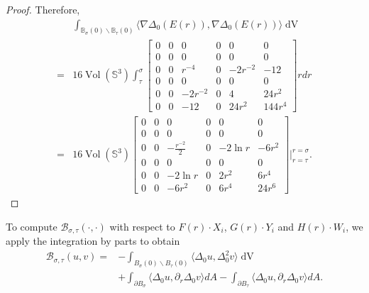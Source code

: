 \documentclass[11pt,letterpaper]{amsart}
\DeclareMathOperator{\Vol}{Vol}
\DeclareMathOperator{\dvol}{dV}
\newcommand{\mB}{\mathcal{B}}
\newcommand{\bB}{\mathbb{B}}
\newcommand{\bS}{\mathbb{S}}
\theoremstyle{definition}
\theoremstyle{remark}
\numberwithin{equation}{section}
\begin{document}
\begin{proof}
Therefore,
\begin{equation}
\begin{split}
    &\int_{\bB_{\sigma}(0)\backslash \bB_{\tau}(0)}\langle \nabla \Delta_0 (E(r)), \nabla \Delta_0(E(r))\rangle \dvol\\
    =&16\Vol(\bS^3)\int^{\sigma}_{\tau}  \begin{bmatrix}
0 & 0 & 0 & 0 & 0& 0\\
0 & 0 & 0 & 0 & 0& 0\\
0 & 0 & r^{-4} & 0 & -2r^{-2}& -12\\
0 & 0 & 0 & 0 & 0& 0\\
0 & 0 & -2r^{-2} & 0 & 4& 24r^2\\
0 & 0 & -12 & 0 & 24r^2& 144r^4
\end{bmatrix}rdr\\
=&16\Vol(\bS^3)\begin{bmatrix}
0 & 0 & 0 & 0 & 0& 0\\
0 & 0 & 0 & 0 & 0& 0\\
0 & 0 & -\frac{r^{-2}}{2} & 0 & -2\ln r& -6r^2\\
0 & 0 & 0 & 0 & 0& 0\\
0 & 0 & -2\ln r & 0 & 2r^2 & 6r^4\\
0 & 0 & -6r^{2} & 0 & 6r^4 & 24r^6
\end{bmatrix}\Bigg|^{r=\sigma}_{r=\tau}.
    \end{split}
\end{equation}
\end{proof}

To compute $\mB_{\sigma, \tau}(\cdot,\cdot)$ with respect to $F(r)\cdot X_i$, $G(r)\cdot Y_i$ and $H(r)\cdot W_i$, we apply the integration by parts to obtain
\begin{equation}\label{integration-by-parts}
\begin{split}
    \mB_{\sigma, \tau}(u,v)=&-\int_{B_{\sigma}(0)\backslash B_{\tau}(0)} \langle  \Delta_0 u, \Delta^2_0 v\rangle \dvol\\
    &+\int_{\partial B_{\sigma}}\langle \Delta_0 u, \partial_r \Delta_0 v\rangle dA-\int_{\partial B_{\tau}}\langle \Delta_0 u, \partial_r \Delta_0 v\rangle dA.
    \end{split}
\end{equation}
\end{document}
